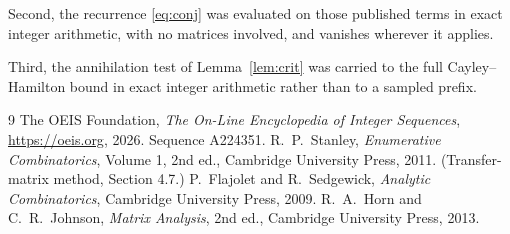 \documentclass[11pt,a4paper]{article}
\theoremstyle{plain}
\theoremstyle{definition}
\begin{document}
Second, the recurrence \eqref{eq:conj} was evaluated on those published terms in exact
integer arithmetic, with no matrices involved, and vanishes wherever it applies.

Third, the annihilation test of Lemma~\ref{lem:crit} was carried to the full
Cayley--Hamilton bound in exact integer arithmetic rather than to a sampled prefix.

\begin{thebibliography}{9}
 The OEIS Foundation, \emph{The On-Line Encyclopedia of Integer
Sequences}, \url{https://oeis.org}, 2026. Sequence A224351.
 R.~P.~Stanley, \emph{Enumerative Combinatorics}, Volume 1, 2nd ed.,
Cambridge University Press, 2011. (Transfer-matrix method, Section 4.7.)
 P.~Flajolet and R.~Sedgewick, \emph{Analytic Combinatorics}, Cambridge
University Press, 2009.
 R.~A.~Horn and C.~R.~Johnson, \emph{Matrix Analysis}, 2nd ed., Cambridge
University Press, 2013.
\end{thebibliography}
\end{document}
